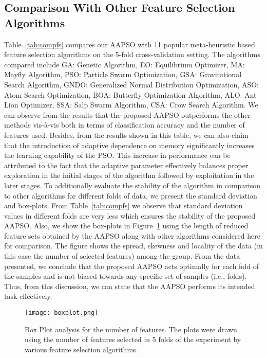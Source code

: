 \documentclass[final,3p,times]{elsarticle}
\begin{document}
\subsection{Comparison With Other Feature Selection Algorithms}
{Table~\ref{tab:compfs} compares our AAPSO with 11 popular meta-heuristic based feature selection algorithms on the 5-fold cross-validation setting. The algorithms compared include GA: Genetic Algorithm, EO: Equilibrium Optimizer, MA: Mayfly Algorithm, PSO: Particle Swarm Optimization, GSA: Gravitational Search Algorithm, GNDO: Generalized Normal Distribution Optimization, ASO: Atom Search Optimization, BOA: Butterfly Optimization Algorithm, ALO: Ant Lion Optimizer, SSA: Salp Swarm Algorithm, CSA: Crow Search Algorithm. We can observe from the results that the proposed AAPSO outperforms the other methods {vis-à-vis} both in terms of classification accuracy and the number of features used. Besides, from the results shown in this table, we can also claim that the introduction of adaptive dependence on memory significantly increases the learning capability of the PSO. This increase in performance can be attributed to the fact that the adaptive parameter effectively balances proper exploration in the initial stages of the algorithm followed by exploitation in the later stages. To additionally {evaluate the stability} of the algorithm in comparison to other algorithms for different folds of data, we present the standard deviation and box-plots. From Table~\ref{tab:compfs} we observe that standard deviation values in different folds are very less which ensures the stability of the proposed AAPSO. Also,{ we show} the box-plots in Figure~\ref{fig:box} using the length of reduced feature sets obtained by the AAPSO along with other algorithms considered here for comparison. The figure shows the spread, skewness and locality of the data (in this case the number of selected features) among the group. From the data presented, we conclude that the proposed AAPSO acts optimally for each fold of {the samples} and is not biased towards any specific {set of samples} (i.e., folds). {Thus,} from this discussion, we {can} state that the AAPSO performs its intended task effectively.}
\begin{figure}[ht!]
    \centering
    \texttt{[image: boxplot.png]}
    \caption{Box Plot analysis for the number of features. The plots were drawn using the number of features selected in 5 folds of the experiment by various feature selection algorithms.}
    \label{fig:box}
\end{figure}
\end{document}
